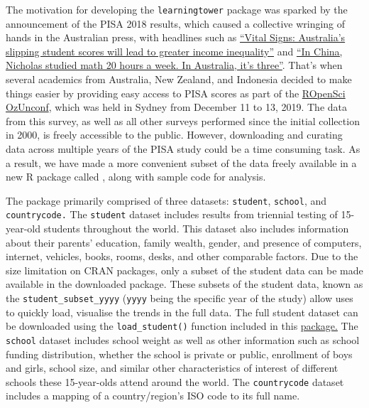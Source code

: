 The motivation for developing the \texttt{learningtower} package was sparked by the announcement of the PISA 2018 results, which caused a collective wringing of hands in the Australian press, with headlines such as \href{https://theconversation.com/vital-signs-australias-slipping-student-scores-will-lead-to-greater-income-inequality-128301}{``Vital Signs: Australia's slipping student scores will lead to greater income inequality''} and \href{https://www.smh.com.au/education/in-china-nicholas-studied-maths-20-hours-a-week-in-australia-it-s-three-20191203-p53ggv.html}{``In China, Nicholas studied math 20 hours a week. In Australia, it's three''}. That's when several academics from Australia, New Zealand, and Indonesia decided to make things easier by providing easy access to PISA scores as part of the \href{https://ozunconf19.ropensci.org/}{ROpenSci OzUnconf}, which was held in Sydney from December 11 to 13, 2019. The data from this survey, as well as all other surveys performed since the initial collection in 2000, is freely accessible to the public. However, downloading and curating data across multiple years of the PISA study could be a time consuming task. As a result, we have made a more convenient subset of the data freely available in a new R package called , along with sample code for analysis.

The  package primarily comprised of three datasets: \texttt{student}, \texttt{school}, and \texttt{countrycode.} The \texttt{student} dataset includes results from triennial testing of 15-year-old students throughout the world. This dataset also includes information about their parents' education, family wealth, gender, and presence of computers, internet, vehicles, books, rooms, desks, and other comparable factors. Due to the size limitation on CRAN packages, only a subset of the student data can be made available in the downloaded package. These subsets of the student data, known as the \texttt{student\_subset\_yyyy} (\texttt{yyyy} being the specific year of the study) allow uses to quickly load, visualise the trends in the full data. The full student dataset can be downloaded using the \texttt{load\_student()} function included in this \href{https://kevinwang09.github.io/learningtower/}{package.} The \texttt{school} dataset includes school weight as well as other information such as school funding distribution, whether the school is private or public, enrollment of boys and girls, school size, and similar other characteristics of interest of different schools these 15-year-olds attend around the world. The \texttt{countrycode} dataset includes a mapping of a country/region's ISO code to its full name.

